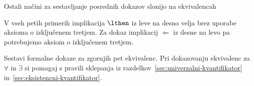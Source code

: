 Ostali načini za sestavljanje posrednih dokazov slonijo na
ekvivalencah
%
%
V vseh petih primerih implikacija $\lthen$ iz leve na desno velja brez
uporabe aksioma o izključenem tretjem. Za dokaz implikacij
$\Leftarrow$ iz desne na levo pa potrebujemo aksiom o izključenem
tretjem.

\begin{vaja}
  Sestavi formalne dokaze za zgornjih pet ekvivalenc. Pri dokazovanju
  ekvivalenc za $\forall$ in $\exists$ si pomagaj s pravili sklepanja
  iz razdelkov~\ref{sec:univerzalni-kvantifikator}
  in~\ref{sec:eksistencni-kvantifikator}.
\end{vaja}

